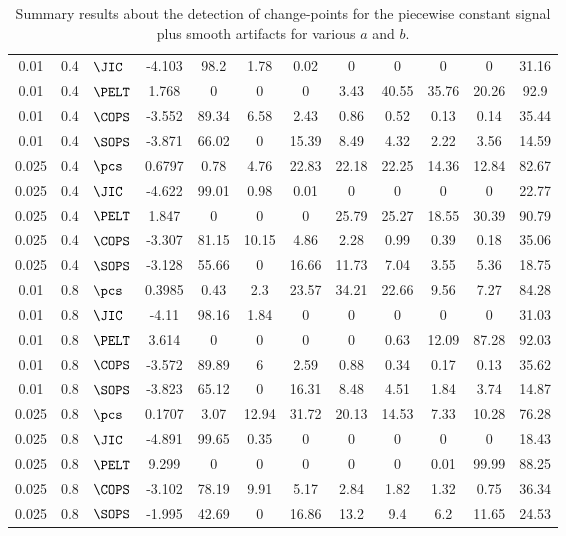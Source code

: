 \begin{table}[ht]
\begin{tabular}{cclccccccccc}
   0.01 &   0.4 & $\JIC$ & -4.103 &  98.2 &  1.78 &  0.02 &     0 &     0 &     0 &     0 & 31.16 \\ 
   0.01 &   0.4 & $\PELT$ & 1.768 &     0 &     0 &     0 &  3.43 & 40.55 & 35.76 & 20.26 &  92.9 \\ 
   0.01 &   0.4 & $\COPS$ & -3.552 & 89.34 &  6.58 &  2.43 &  0.86 &  0.52 &  0.13 &  0.14 & 35.44 \\ 
   0.01 &   0.4 & $\SOPS$ & -3.871 & 66.02 &     0 & 15.39 &  8.49 &  4.32 &  2.22 &  3.56 & 14.59 \\ 
   \hline
0.025 &   0.4 & $\pcs$ & 0.6797 &  0.78 &  4.76 & 22.83 & 22.18 & 22.25 & 14.36 & 12.84 & 82.67 \\ 
  0.025 &   0.4 & $\JIC$ & -4.622 & 99.01 &  0.98 &  0.01 &     0 &     0 &     0 &     0 & 22.77 \\ 
  0.025 &   0.4 & $\PELT$ & 1.847 &     0 &     0 &     0 & 25.79 & 25.27 & 18.55 & 30.39 & 90.79 \\ 
  0.025 &   0.4 & $\COPS$ & -3.307 & 81.15 & 10.15 &  4.86 &  2.28 &  0.99 &  0.39 &  0.18 & 35.06 \\ 
  0.025 &   0.4 & $\SOPS$ & -3.128 & 55.66 &     0 & 16.66 & 11.73 &  7.04 &  3.55 &  5.36 & 18.75 \\ 
   \hline
 0.01 &   0.8 & $\pcs$ & 0.3985 &  0.43 &   2.3 & 23.57 & 34.21 & 22.66 &  9.56 &  7.27 & 84.28 \\ 
   0.01 &   0.8 & $\JIC$ & -4.11 & 98.16 &  1.84 &     0 &     0 &     0 &     0 &     0 & 31.03 \\ 
   0.01 &   0.8 & $\PELT$ & 3.614 &     0 &     0 &     0 &     0 &  0.63 & 12.09 & 87.28 & 92.03 \\ 
   0.01 &   0.8 & $\COPS$ & -3.572 & 89.89 &     6 &  2.59 &  0.88 &  0.34 &  0.17 &  0.13 & 35.62 \\ 
   0.01 &   0.8 & $\SOPS$ & -3.823 & 65.12 &     0 & 16.31 &  8.48 &  4.51 &  1.84 &  3.74 & 14.87 \\ 
   \hline
0.025 &   0.8 & $\pcs$ & 0.1707 &  3.07 & 12.94 & 31.72 & 20.13 & 14.53 &  7.33 & 10.28 & 76.28 \\ 
  0.025 &   0.8 & $\JIC$ & -4.891 & 99.65 &  0.35 &     0 &     0 &     0 &     0 &     0 & 18.43 \\ 
  0.025 &   0.8 & $\PELT$ & 9.299 &     0 &     0 &     0 &     0 &     0 &  0.01 & 99.99 & 88.25 \\ 
  0.025 &   0.8 & $\COPS$ & -3.102 & 78.19 &  9.91 &  5.17 &  2.84 &  1.82 &  1.32 &  0.75 & 36.34 \\ 
  0.025 &   0.8 & $\SOPS$ & -1.995 & 42.69 &     0 & 16.86 &  13.2 &   9.4 &   6.2 & 11.65 & 24.53 \\ 
   \hline
\end{tabular}
\caption{Summary results about the detection of change-points for the piecewise constant signal plus smooth artifacts for various $a$ and $b$.} 
\label{tab:CPcp}
\end{table}
